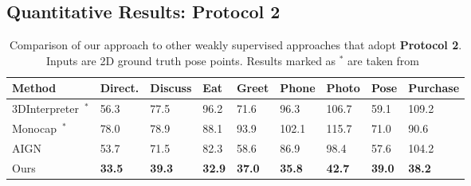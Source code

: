 \documentclass[runningheads]{llncs}
\begin{document}
\subsection{Quantitative Results: Protocol 2}\begin{table*}[htb!]
		\caption{Comparison of our approach to other weakly supervised approaches that adopt \textbf{Protocol 2}. Inputs are 2D ground truth pose points. Results marked as $^{\ast}$ are taken from~\cite{Tung_2017_ICCV}}
	\label{table:protocol2_gt}
	\centering
		\begin{tabularx}{\textwidth}{ l *{8}{Y} }
		\toprule
		Method & Direct. & Discuss & Eat & Greet & Phone & Photo & Pose & Purchase \\
		\midrule
		3DInterpreter~\cite{InterpreterNetwork2016}$^{\ast}$ & 56.3 & 77.5 & 96.2 & 71.6 & 96.3 & 106.7 & 59.1 & 109.2\\
		Monocap~\cite{MonoCap}$^{\ast}$&  78.0 & 78.9 & 88.1 & 93.9 & 102.1 & 115.7 & 71.0 & 90.6\\
		AIGN~\cite{Tung_2017_ICCV}  & 53.7 & 71.5 & 82.3 & 58.6 & 86.9 & 98.4 & 57.6 & 104.2 \\
		Ours & {\bf 33.5}&	{\bf 39.3}&	{\bf 32.9}&	{\bf 37.0}&	{\bf 35.8}&	{\bf 42.7}&	{\bf 39.0}&	{\bf 38.2}\\


\end{tabularx}
\end{table*}
\end{document}
